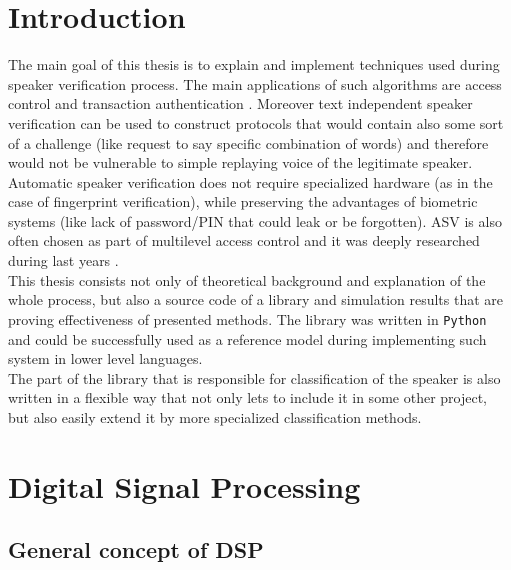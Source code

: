 \documentclass[magister]{dyplom}
\begin{document}
	\maketitle
	\tableofcontents
		
	
	\chapter{Introduction}
	
	The main goal of this thesis is to explain and implement techniques used during speaker verification process. The main applications of such algorithms are access control and transaction authentication \cite{OverviewOfSpeakerTechnology}. Moreover text independent speaker verification can be used to construct protocols that would contain also some sort of a challenge (like request to say specific combination of words) and therefore would not be vulnerable to simple replaying voice of the legitimate speaker. Automatic speaker verification does not require specialized hardware (as in the case of fingerprint verification), while preserving the advantages of biometric systems (like lack of password/PIN that could leak or be forgotten). \gls{ASV} is also often chosen as part of multilevel access control and it was deeply researched during last years \cite{SpeakerRecognition}.\\
	
	This thesis consists not only of theoretical background and explanation of the whole process, but also a source code of a library and simulation results that are proving effectiveness of presented methods. The library was written in \texttt{Python} and could be successfully used as a reference model during implementing such system in lower level languages.\\
	
	The part of the library that is responsible for classification of the speaker is also written in a flexible way that not only lets to include it in some other project, but also easily extend it by more specialized classification methods.
	
	\chapter{Digital Signal Processing}
	
	\section{General concept of DSP} \label{sec:general_concept_DSP}
	
\end{document}

